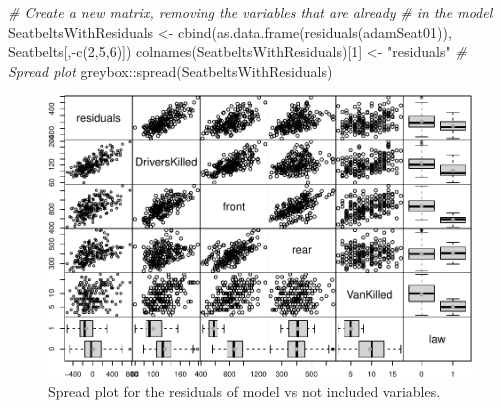 \documentclass[
]{book}
\newenvironment{Shaded}{\begin{snugshade}}{\end{snugshade}}
\newcommand{\CommentTok}[1]{\textcolor[rgb]{0.56,0.35,0.01}{\textit{#1}}}
\newcommand{\DecValTok}[1]{\textcolor[rgb]{0.00,0.00,0.81}{#1}}
\newcommand{\FunctionTok}[1]{\textcolor[rgb]{0.00,0.00,0.00}{#1}}
\newcommand{\NormalTok}[1]{#1}
\newcommand{\OtherTok}[1]{\textcolor[rgb]{0.56,0.35,0.01}{#1}}
\newcommand{\SpecialCharTok}[1]{\textcolor[rgb]{0.00,0.00,0.00}{#1}}
\newcommand{\StringTok}[1]{\textcolor[rgb]{0.31,0.60,0.02}{#1}}
\theoremstyle{definition}
\theoremstyle{definition}
\theoremstyle{definition}
\theoremstyle{definition}
\theoremstyle{remark}
\begin{document}
\begin{Shaded}
\begin{Highlighting}[]
\CommentTok{\# Create a new matrix, removing the variables that are already}
\CommentTok{\# in the model}
\NormalTok{SeatbeltsWithResiduals }\OtherTok{\textless{}{-}}
  \FunctionTok{cbind}\NormalTok{(}\FunctionTok{as.data.frame}\NormalTok{(}\FunctionTok{residuals}\NormalTok{(adamSeat01)),}
\NormalTok{        Seatbelts[,}\SpecialCharTok{{-}}\FunctionTok{c}\NormalTok{(}\DecValTok{2}\NormalTok{,}\DecValTok{5}\NormalTok{,}\DecValTok{6}\NormalTok{)])}
\FunctionTok{colnames}\NormalTok{(SeatbeltsWithResiduals)[}\DecValTok{1}\NormalTok{] }\OtherTok{\textless{}{-}} \StringTok{"residuals"}
\CommentTok{\# Spread plot}
\NormalTok{greybox}\SpecialCharTok{::}\FunctionTok{spread}\NormalTok{(SeatbeltsWithResiduals)}
\end{Highlighting}
\end{Shaded}

\begin{figure}
\centering
\includegraphics{Svetunkov--2022----ADAM_files/figure-latex/carSeatsSpread-1.pdf}
\caption{\label{fig:carSeatsSpread}Spread plot for the residuals of model vs not included variables.}
\end{figure}
\end{document}

